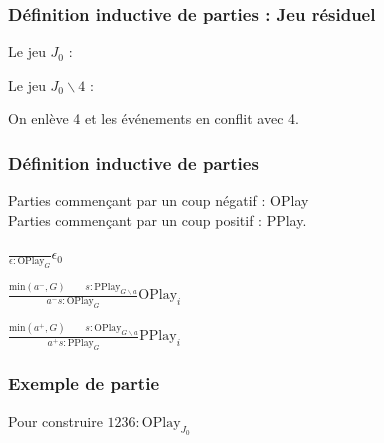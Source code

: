 \documentclass{beamer}
\begin{document}
\begin{frame}
\frametitle{Définition inductive de parties : Jeu résiduel}


Le jeu $J_0$ :


Le jeu $J_0\backslash 4$ :


On enlève 4 et les événements en conflit avec 4.
\end{frame}

\begin{frame}
\frametitle{Définition inductive de parties}

Parties commençant par un coup négatif : OPlay\\
Parties commençant par un coup positif : PPlay.

$\frac{}{\epsilon : \text{OPlay}_G}\epsilon_0$

$\frac{\text{min}(a^-,G) \qquad s : \text{PPlay}_{G\backslash a}}
{a^-s : \text{OPlay}_G}\text{OPlay}_i$

$\frac{\text{min}(a^+,G) \qquad s : \text{OPlay}_{G\backslash a}}
{a^+s : \text{PPlay}_G}\text{PPlay}_i$

\end{frame}

\begin{frame}
\frametitle{Exemple de partie}


Pour construire $1236 : \text{OPlay}_{J_0}$


\end{frame}
\end{document}
